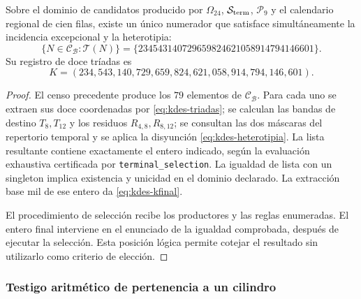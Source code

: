 \begin{theorem}
Sobre el dominio de candidatos producido por
$\Omega_{24}$, $\mathcal S_{\rm term}$, $\mathcal P_9$ y el calendario
regional de cien filas, existe un único numerador que satisface
simultáneamente la incidencia excepcional y la heterotipia:
\[
 \{N\in\mathcal C_{\mathcal B}:\mathcal T(N)\}
 =\{234543140729659824621058914794146601\}.
\]
Su registro de doce tríadas es
\begin{equation}
 K=(234,543,140,729,659,824,621,058,914,794,146,601).
 \label{eq:kdes-kfinal}
\end{equation}
\end{theorem}
\begin{proof}
El censo precedente produce los $79$ elementos de
$\mathcal C_{\mathcal B}$. Para cada uno se extraen sus doce
coordenadas por \eqref{eq:kdes-triadas}; se calculan las bandas de
destino $T_8,T_{12}$ y los residuos $R_{4,8},R_{8,12}$; se consultan
las dos máscaras del repertorio temporal y se aplica la disyunción
\eqref{eq:kdes-heterotipia}. La lista resultante contiene exactamente
el entero indicado, según la evaluación exhaustiva certificada por
\texttt{terminal\_selection}. La igualdad de lista con un singleton
implica existencia y unicidad en el dominio declarado. La extracción
base mil de ese entero da \eqref{eq:kdes-kfinal}.

El procedimiento de selección recibe los productores y las reglas
enumeradas. El entero final interviene en el enunciado de la igualdad
comprobada, después de ejecutar la selección. Esta posición lógica
permite cotejar el resultado sin utilizarlo como criterio de elección.
\end{proof}

\subsubsection{Testigo aritmético de pertenencia a un cilindro}

